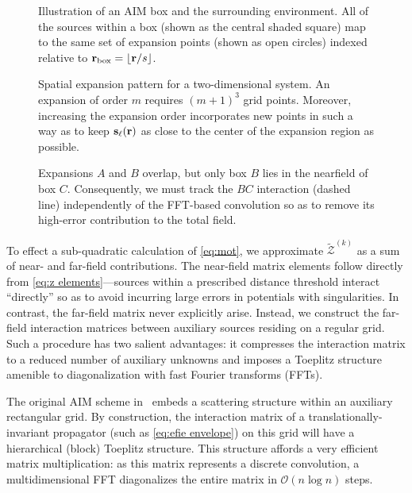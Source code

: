 \begin{figure}
  \centering
  
  \caption{\label{fig:aim terminology} Illustration of an AIM box and the surrounding environment.
    All of the sources within a box (shown as the central shaded square) map to the same set of expansion points (shown as open circles) indexed relative to $\vb{r}_\text{box} = \lfloor\vb{r}/s\rfloor$.
  }
\end{figure}

\begin{figure}
  \centering
  \caption{\label{fig:expansion grid}Spatial expansion pattern for a two-dimensional system.
    An expansion of order $m$ requires $(m + 1)^3$ grid points.
    Moreover, increasing the expansion order incorporates new points in such a way as to keep $\vb{s}_\ell(\vb{r})$ as close to the center of the expansion region as possible.
  }
\end{figure}

\begin{figure}
  \centering
  \caption{\label{fig:nearfield correction}Expansions $A$ and $B$ overlap, but only box $B$ lies in the nearfield of box $C$.
    Consequently, we must track the $BC$ interaction (dashed line) independently of the FFT-based convolution so as to remove its high-error contribution to the total field.
  }
\end{figure}

To effect a sub-quadratic calculation of \cref{eq:mot}, we approximate $\tilde{\mathcal{Z}}^{(k)}$ as a sum of near- and far-field contributions.
The near-field matrix elements follow directly from \cref{eq:z elements}---sources within a prescribed distance threshold interact ``directly'' so as to avoid incurring large errors in potentials with singularities.
In contrast, the far-field matrix never explicitly arise.
Instead, we construct the far-field interaction matrices between auxiliary sources residing on a regular grid.
Such a procedure has two salient advantages: it compresses the interaction matrix to a reduced number of auxiliary unknowns and imposes a Toeplitz structure amenible to diagonalization with fast Fourier transforms (FFTs).

The original AIM scheme in~\cite{Bleszynski1996} embeds a scattering structure within an auxiliary rectangular grid.
By construction, the interaction matrix of a translationally-invariant propagator (such as \cref{eq:efie envelope}) on this grid will have a hierarchical (block) Toeplitz structure.
This structure affords a very efficient matrix multiplication: as this matrix represents a discrete convolution, a multidimensional FFT diagonalizes the entire matrix in $\mathcal{O}(n \log n)$ steps.

